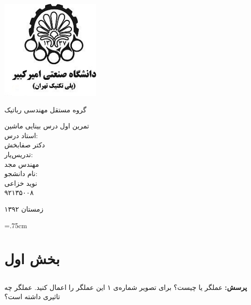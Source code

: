 \documentclass[12pt,a4paper]{article}
\theoremstyle{definition}
\theoremstyle{theorem}
\theoremstyle{definition}
\begin{document}
\thispagestyle{empty}
\vspace*{-28mm}
\centerline{\includegraphics[height=5cm]{logo.jpg}}
\begin{center}
\vspace{-2mm}
{\large \titr
گروه مستقل مهندسی رباتیک
\\[2.1cm]
}

{\Large \titr
تمرین اول درس بینایی ماشین
\\[2cm]
استاد درس:
\\[.5cm]
دکتر صفابخش
\\[1.5cm]
\large 
تدریس‌یار: 
\\[0.5cm]
مهندس مجد
\\[1.5cm]
نام دانشجو:
\\[.5cm]
نوید خزاعی
\\[.5cm]
۹۲۱۳۵۰۰۸
\\[1.5cm]
}
\baselineskip=1cm

{\large
زمستان ۱۳۹۲
}
\end{center}
\newpage
\baselineskip=1cm
\tableofcontents

\baselineskip=.75cm
\newpage 
\section{بخش اول}
\subsection{{
}
}



\textbf{پرسش:}
عملگر 
یا 
چیست؟ برای تصویر شماره‌ی ۱ این عملگر را اعمال کنید. عملگر چه تاثیری داشته است؟
\end{document}
